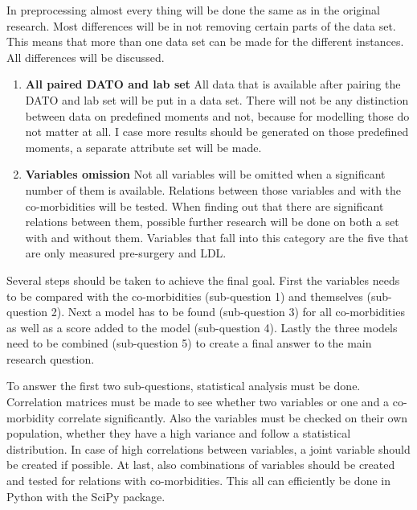 \documentclass[10pt,a4paper]{article}
\begin{document}
	In preprocessing almost every thing will be done the same as in the original research. Most differences will be in not removing certain parts of the data set. This means that more than one data set can be made for the different instances. All differences will be discussed.
	
		\begin{enumerate}
		\item \textbf{All paired DATO and lab set} All data that is available after pairing the DATO and lab set will be put in a data set. There will not be any distinction between data on predefined moments and not, because for modelling those do not matter at all. I case more results should be generated on those predefined moments, a separate attribute set will be made.
		
		\item \textbf{Variables omission} Not all variables will be omitted when a significant number of them is available. Relations between those variables and with the co-morbidities will be tested. When finding out that there are significant relations between them, possible further research will be done on both a set with and without them. Variables that fall into this category are the five that are only measured pre-surgery and LDL.
		
	\end{enumerate}
	
	Several steps should be taken to achieve the final goal. First the variables needs to be compared with the co-morbidities (sub-question 1) and themselves (sub-question 2). Next a model has to be found (sub-question 3) for all co-morbidities as well as a score added to the model (sub-question 4). Lastly the three models need to be combined (sub-question 5) to create a final answer to the main research question.
	
	To answer the first two sub-questions, statistical analysis must be done. Correlation matrices must be made to see whether two variables or one and a co-morbidity correlate significantly. Also the variables must be checked on their own population, whether they have a high variance and follow a statistical distribution. In case of high correlations between variables, a joint variable should be created if possible. At last, also combinations of variables should be created and tested for relations with co-morbidities. This all can efficiently be done in Python with the SciPy package.
	
\end{document}
